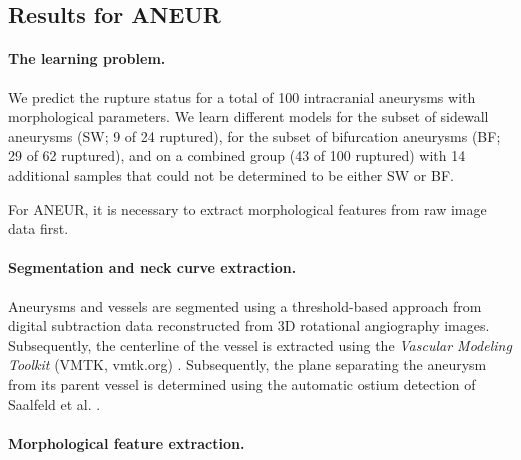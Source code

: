 \documentclass[
  oneside]{book}
\begin{document}
\hypertarget{iml-results-aneur}{%
\subsection{Results for ANEUR}\label{iml-results-aneur}}

\paragraph*{The learning problem.}

We predict the rupture status for a total of 100 intracranial aneurysms with morphological parameters.
We learn different models for the subset of sidewall aneurysms (SW; 9 of 24 ruptured), for the subset of bifurcation aneurysms (BF; 29 of 62 ruptured), and on a combined group (43 of 100 ruptured) with 14 additional samples that could not be determined to be either SW or BF.

For ANEUR, it is necessary to extract morphological features from raw image data first.

\paragraph*{Segmentation and neck curve extraction.}

Aneurysms and vessels are segmented using a threshold-based approach \autocite{Glasser2015} from digital subtraction data reconstructed from 3D rotational angiography images.
Subsequently, the centerline of the vessel is extracted using the \emph{Vascular Modeling Toolkit} (VMTK, vmtk.org) \autocite{Antiga2008}.
Subsequently, the plane separating the aneurysm from its parent vessel is determined using the automatic ostium detection of Saalfeld et al. \autocite{Saalfeld2018}.

\paragraph*{Morphological feature extraction.}
\end{document}
